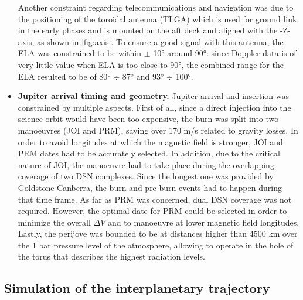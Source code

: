 \begin{itemize}
    Another constraint regarding telecommunications and navigation was due to the positioning of the toroidal antenna (TLGA) which is used for ground link in the early phases and is mounted on the aft deck and aligned with the -Z-axis, as shown in \autoref{fig:axis}.
    To ensure a good signal with this antenna, the ELA was constrained to be within $\pm$ 10° around 90°: since Doppler data is of very little value when ELA is too close to 90°, the combined range for the ELA resulted to be of 80° $\div$ 87° and 93° $\div$ 100°.
    \item \textbf{Jupiter arrival timing and geometry.} Jupiter arrival and insertion was constrained by multiple aspects. First of all, since a direct injection into the science orbit would have been too expensive, the burn was split into two manoeuvres (JOI and PRM), saving over 170 m/s \cite{launch_period} related to gravity losses. In order to avoid longitudes at which the magnetic field is stronger, JOI and PRM dates had to be accurately selected. In addition, due to the critical nature of JOI, the manoeuvre had to take place during the overlapping coverage of two DSN complexes. Since the longest one was provided by Goldstone-Canberra, the burn and pre-burn events had to happen during that time frame. As far as PRM was concerned, dual DSN coverage was not required. However, the optimal date for PRM could be selected in order to minimize the overall $\Delta V$ and to manoeuvre at lower magnetic field longitudes. Lastly, the perijove was bounded to be at distances higher than 4500 km over the 1 bar pressure level of the atmosphere, allowing to operate in the hole of the torus that describes the highest radiation levels.
\end{itemize}

\subsection{Simulation of the interplanetary trajectory}
\label{subsec:simulation_interplanetary_trajectory}

